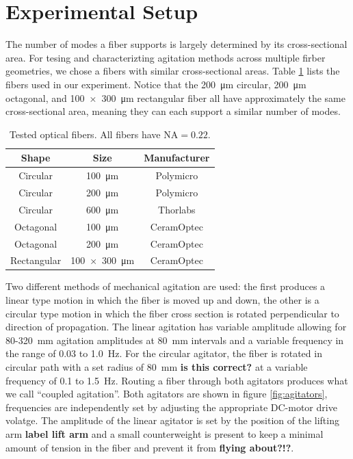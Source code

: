 \documentclass[twocolumn]{emulateapj}
\begin{document}
\section{Experimental Setup}
\label{sec:experimental_setup}
The number of modes a fiber supports is largely determined by its cross-sectional area. For tesing and characterizting agitation methods across multiple firber geometries, we chose a fibers with similar cross-sectional areas. Table \ref{table:fibers} lists the fibers used in our experiment. Notice that the \SI{200}{\micro\meter} circular, \SI{200}{\micro\meter} octagonal, and \SI{100x300}{\micro\meter} rectangular fiber all have approximately the same cross-sectional area, meaning they can each support a similar number of modes.

\begin{table}
\centering
\caption{Tested optical fibers. All fibers have $\mathrm{NA} = 0.22$.}
	\begin{tabular}{ccc}
	\hline
	Shape & Size & Manufacturer \\
	\hline
	\hline
	Circular & \SI{100}{\micro\meter} & Polymicro \\
	Circular & \SI{200}{\micro\meter} & Polymicro \\
	Circular & \SI{600}{\micro\meter} & Thorlabs \\
	Octagonal & \SI{100}{\micro\meter} & CeramOptec \\
	Octagonal & \SI{200}{\micro\meter} & CeramOptec \\
	Rectangular & \SI{100x300}{\micro\meter} & CeramOptec \\
	\hline
	\end{tabular}
\label{table:fibers}
\end{table}

Two different methods of mechanical agitation are used: the first produces a linear type motion in which the fiber is moved up and down, the other is a circular type motion in which the fiber cross section is rotated perpendicular to direction of propagation. The linear agitation has variable amplitude allowing for 80-\SI{320}{\milli\meter} agitation amplitudes at \SI{80}{\milli\meter} intervals and a variable frequency in the range of 0.03 to \SI{1.0}{\hertz}. For the circular agitator, the fiber is rotated in circular path with a set radius of \SI{80}{\milli\meter} \textbf{is this correct?} at a variable frequency of  0.1 to \SI{1.5}{\hertz}. Routing a fiber through both agitators produces what we call ``coupled agitation''.  Both agitators are shown in figure \ref{fig:agitators}, frequencies are independently set by adjusting the appropriate DC-motor drive volatge. The amplitude of the linear agitator is set by the position of the lifting arm \textbf{label lift arm} and a small counterweight is present to keep a minimal amount of tension in the fiber and prevent it from \textbf{flying about?!?}.
\end{document}
